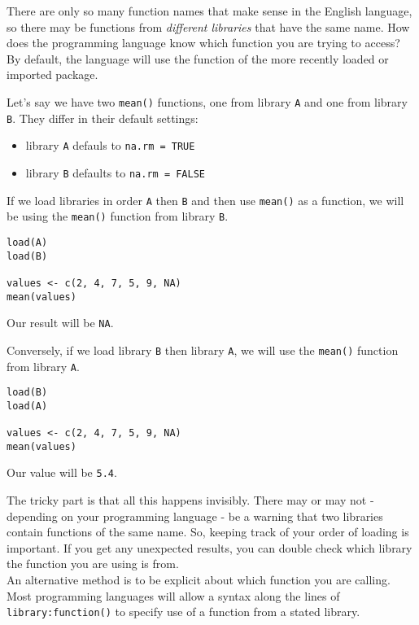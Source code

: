 \documentclass[
]{book}
\providecommand{\tightlist}{%
  \setlength{\itemsep}{0pt}\setlength{\parskip}{0pt}}
\begin{document}
There are only so many function names that make sense in the English language, so there may be functions from \emph{different libraries} that have the same name. How does the programming language know which function you are trying to access? By default, the language will use the function of the more recently loaded or imported package.

Let's say we have two \texttt{mean()} functions, one from library \texttt{A} and one from library \texttt{B}. They differ in their default settings:

\begin{itemize}
\tightlist
\item
  library \texttt{A} defauls to \texttt{na.rm\ =\ TRUE}
\item
  library \texttt{B} defaults to \texttt{na.rm\ =\ FALSE}
\end{itemize}

If we load libraries in order \texttt{A} then \texttt{B} and then use \texttt{mean()} as a function, we will be using the \texttt{mean()} function from library \texttt{B}.

\begin{verbatim}
load(A)
load(B)

values <- c(2, 4, 7, 5, 9, NA)
mean(values)
\end{verbatim}

Our result will be \texttt{NA}.

Conversely, if we load library \texttt{B} then library \texttt{A}, we will use the \texttt{mean()} function from library \texttt{A}.

\begin{verbatim}
load(B)
load(A)

values <- c(2, 4, 7, 5, 9, NA)
mean(values)
\end{verbatim}

Our value will be \texttt{5.4}.

The tricky part is that all this happens invisibly. There may or may not - depending on your programming language - be a warning that two libraries contain functions of the same name. So, keeping track of your order of loading is important. If you get any unexpected results, you can double check which library the function you are using is from.\\

An alternative method is to be explicit about which function you are calling. Most programming languages will allow a syntax along the lines of \texttt{library:function()} to specify use of a function from a stated library.\\
\end{document}
